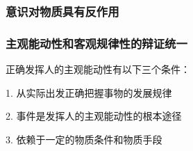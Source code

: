 \subsubsection*{意识对物质具有反作用}%
\label{subsub:意识对物质具有反作用}

\subsubsection*{主观能动性和客观规律性的辩证统一}%
\label{subsub:主观能动性和客观规律性的辩证统一}
正确发挥人的主观能动性有以下三个条件：

1. 从实际出发正确把握事物的发展规律

2. 事件是发挥人的主观能动性的根本途径

3. 依赖于一定的物质条件和物质手段
